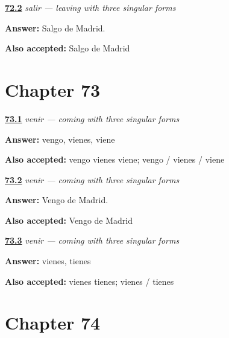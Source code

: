 \noindent\begin{minipage}[t]{\linewidth}
\raggedright
\hyperlink{review-ES-C13-salir-leave-madrid}{\textbf{72.2}} \emph{salir — leaving with three singular forms}\par
\small \textbf{Answer:} Salgo de Madrid.\par
\footnotesize \textbf{Also accepted:} Salgo de Madrid
\end{minipage}\par\medskip

\section*{Chapter 73}

\noindent\begin{minipage}[t]{\linewidth}
\raggedright
\hyperlink{review-ES-C13-venir-singular-forms}{\textbf{73.1}} \emph{venir — coming with three singular forms}\par
\small \textbf{Answer:} vengo, vienes, viene\par
\footnotesize \textbf{Also accepted:} vengo vienes viene; vengo / vienes / viene
\end{minipage}\par\medskip

\noindent\begin{minipage}[t]{\linewidth}
\raggedright
\hyperlink{review-ES-C13-venir-come-from-madrid}{\textbf{73.2}} \emph{venir — coming with three singular forms}\par
\small \textbf{Answer:} Vengo de Madrid.\par
\footnotesize \textbf{Also accepted:} Vengo de Madrid
\end{minipage}\par\medskip

\noindent\begin{minipage}[t]{\linewidth}
\raggedright
\hyperlink{review-ES-C13-venir-tener-contrast}{\textbf{73.3}} \emph{venir — coming with three singular forms}\par
\small \textbf{Answer:} vienes, tienes\par
\footnotesize \textbf{Also accepted:} vienes tienes; vienes / tienes
\end{minipage}\par\medskip

\section*{Chapter 74}

